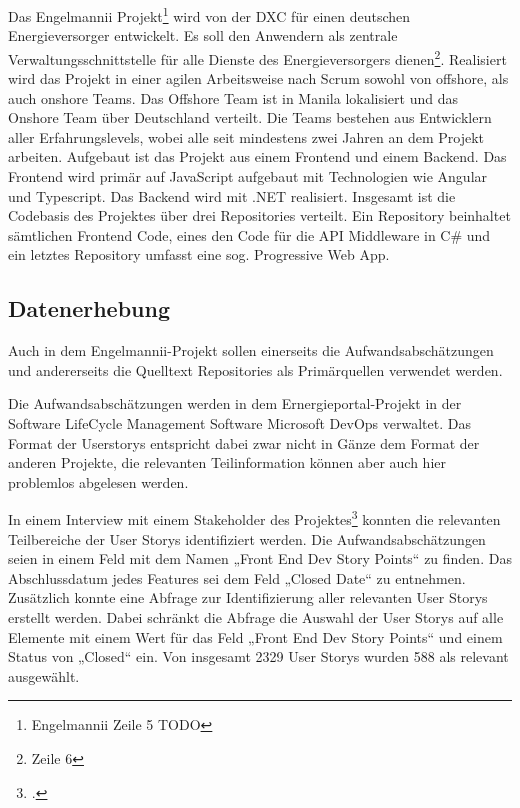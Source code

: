 Das Engelmannii Projekt\footnote{Engelmannii Zeile 5 TODO} wird von der
DXC für einen deutschen Energieversorger entwickelt. Es soll den
Anwendern als zentrale Verwaltungsschnittstelle für alle Dienste des
Energieversorgers dienen\footnote{Zeile 6}. Realisiert wird das Projekt
in einer agilen Arbeitsweise nach Scrum sowohl von offshore, als auch
onshore Teams. Das Offshore Team ist in Manila lokalisiert und das
Onshore Team über Deutschland verteilt. Die Teams bestehen aus
Entwicklern aller Erfahrungslevels, wobei alle seit mindestens zwei
Jahren an dem Projekt arbeiten. Aufgebaut ist das Projekt aus einem
Frontend und einem Backend. Das Frontend wird primär auf JavaScript
aufgebaut mit Technologien wie Angular und Typescript. Das Backend wird
mit .NET realisiert. Insgesamt ist die Codebasis des Projektes über drei
Repositories verteilt. Ein Repository beinhaltet sämtlichen Frontend
Code, eines den Code für die \ac{API} Middleware in C\# und ein letztes
Repository umfasst eine sog. Progressive Web App.

\subsection{Datenerhebung}\label{engelmannii-Datenerhebung}

Auch in dem Engelmannii-Projekt sollen einerseits die
Aufwandsabschätzungen und andererseits die Quelltext Repositories als
Primärquellen verwendet werden.

Die Aufwandsabschätzungen werden in dem Ernergieportal-Projekt in der
Software LifeCycle Management Software Microsoft DevOps verwaltet. Das
Format der Userstorys entspricht dabei zwar nicht in Gänze dem Format
der anderen Projekte, die relevanten Teilinformation können aber auch
hier problemlos abgelesen werden.

In einem Interview mit einem Stakeholder des Projektes\footcite[Vgl. ][]{stakeholdernInterviewMitStakeholdern2022}
konnten die relevanten Teilbereiche der User Storys identifiziert
werden. Die Aufwandsabschätzungen seien in einem Feld mit dem Namen
„Front End Dev Story Points`` zu finden. Das Abschlussdatum jedes
Features sei dem Feld „Closed Date`` zu entnehmen. Zusätzlich konnte
eine Abfrage zur Identifizierung aller relevanten User Storys erstellt
werden. Dabei schränkt die Abfrage die Auswahl der User Storys auf alle
Elemente mit einem Wert für das Feld „Front End Dev Story Points`` und
einem Status von „Closed`` ein. Von insgesamt 2329 User Storys wurden
588 als relevant ausgewählt.

